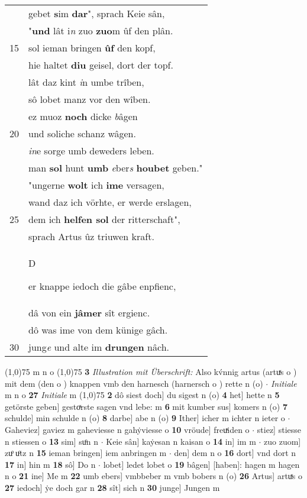 \documentclass[8pt,a4paper,notitlepage]{article}
\begin{document}
\begin{table}[ht]
\begin{minipage}[t]{0.5\linewidth}
\begin{tabular}{rl}
 & gebet \textbf{s}im \textbf{dar}", sprach Keie sân,\\ 
 & "\textbf{und} lât i\textit{n} zuo \textbf{zuo}m ûf den plân.\\ 
15 & sol ieman bringen \textbf{ûf} den kopf,\\ 
 & hie haltet \textbf{diu} geisel, dort der topf.\\ 
 & lât daz kint \textit{i}n umbe trîben,\\ 
 & sô lobet manz vor den wîben.\\ 
 & ez muoz \textbf{noch} dicke \textit{b}âgen\\ 
20 & und soliche schanz wâgen.\\ 
 & \textit{in}e sorge umb deweders leben.\\ 
 & man \textbf{sol} hunt \textbf{umb} \textit{e}ber\textit{s} \textbf{houbet} geben."\\ 
 & "ungerne \textbf{wolt} ich \textbf{ime} versagen,\\ 
 & wand daz ich vörhte, er werde erslagen,\\ 
25 & dem ich \textbf{helfen sol} der ritterschaft",\\ 
 & sprach Artus ûz triuwen kraft.\\ 
 & \begin{large}D\end{large}er knappe iedoch die gâbe enpfienc,\\ 
 & dâ von ein \textbf{jâmer} sît ergienc.\\ 
 & dô was ime von dem künige gâch.\\ 
30 & jung\textit{e} und alte im \textbf{drungen} nâch.\\ 
\end{tabular}
\scriptsize
\line(1,0){75} \newline
m n o \newline
\line(1,0){75} \newline
\textbf{3} \textit{Illustration mit Überschrift:} Also kv́nnig artus (artuͯs o  ) mit dem (den o  ) knappen vmb den harnesch (harnersch o  ) rette n (o)   $\cdot$ \textit{Initiale} m n o  \textbf{27} \textit{Initiale} m  \newline
\line(1,0){75} \newline
\textbf{2} dô siest doch] du sigest n (o) \textbf{4} het] hette n \textbf{5} getörste geben] gestoͯrste sagen vnd lebe: m \textbf{6} mit kumber sus] komers n (o) \textbf{7} schulde] min schulde n (o) \textbf{8} darbe] abe n (o) \textbf{9} Ither] icher m ichter n ieter o  $\cdot$ Gaheviez] gaviez m gaheviesse n gahẏviesse o \textbf{10} vröude] freuͯiden o  $\cdot$ stiez] stiesse n stiessen o \textbf{13} sim] suͦn n  $\cdot$ Keie sân] kaẏesan n kaisan o \textbf{14} in] im m  $\cdot$ zuo zuom] zuͦ uͦtz n \textbf{15} ieman bringen] iem anbringen m  $\cdot$ den] dem n o \textbf{16} dort] vnd dort n \textbf{17} in] hin m \textbf{18} sô] Do n  $\cdot$ lobet] ledet lobet o \textbf{19} bâgen] [haben]: hagen m hagen n o \textbf{21} ine] Me m \textbf{22} umb ebers] vmbbeber m vmb bobers n (o) \textbf{26} Artus] artuͯs o \textbf{27} iedoch] ẏe doch gar n \textbf{28} sît] sich n \textbf{30} junge] Jungen m \newline

\end{minipage}
\end{table}
\end{document}
